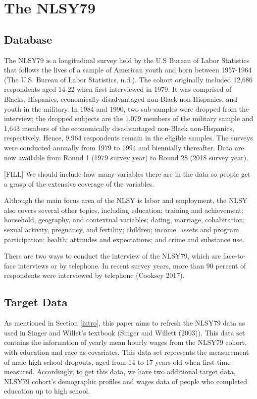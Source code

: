 \documentclass{article}
\begin{document}
\hypertarget{database}{%
\section{The NLSY79}\label{database}}

\hypertarget{database-1}{%
\subsection{Database}\label{database-1}}

The NLSY79 is a longitudinal survey held by the U.S Bureau of Labor Statistics that follows the lives of a sample of American youth and born between 1957-1964 (The U.S. Bureau of Labor Statistics, n.d.). The cohort originally included 12,686 respondents aged 14-22 when first interviewed in 1979. It was comprised of Blacks, Hispanics, economically disadvantaged non-Black non-Hispanics, and youth in the military. In 1984 and 1990, two sub-samples were dropped from the interview; the dropped subjects are the 1,079 members of the military sample and 1,643 members of the economically disadvantaged non-Black non-Hispanics, respectively. Hence, 9,964 respondents remain in the eligible samples. The surveys were conducted annually from 1979 to 1994 and biennially thereafter. Data are now available from Round 1 (1979 survey year) to Round 28 (2018 survey year).

{[}FILL{]} We should include how many variables there are in the data so people get a grasp of the extensive coverage of the variables.

Although the main focus area of the NLSY is labor and employment, the NLSY also covers several other topics, including education; training and achievement; household, geography, and contextual variables; dating, marriage, cohabitation; sexual activity, pregnancy, and fertility; children; income, assets and program participation; health; attitudes and expectations; and crime and substance use.

There are two ways to conduct the interview of the NLSY79, which are face-to-face interviews or by telephone. In recent survey years, more than 90 percent of respondents were interviewed by telephone (Cooksey 2017).

\hypertarget{target-data}{%
\subsection{Target Data}\label{target-data}}

As mentioned in Section \ref{intro}, this paper aims to refresh the NLSY79 data as used in Singer and Willet's textbook (Singer and Willett (2003)). This data set contains the information of yearly mean hourly wages from the NLSY79 cohort, with education and race as covariates. This data set represents the measurement of male high-school dropouts, aged from 14 to 17 years old when first time measured. Accordingly, to get this data, we have two additional target data, NLSY79 cohort's demographic profiles and wages data of people who completed education up to high school.
\end{document}
